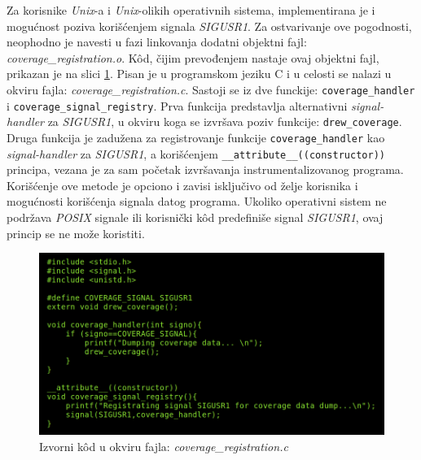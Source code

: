 \documentclass[12pt,oneside]{memoir}
\newcommand{\kod}[1]{\texttt{#1}}
\newcommand{\strano}[1]{\textit{#1}}
\begin{document}
Za korisnike \strano{Unix}-a i \strano{Unix}-olikih operativnih sistema, implementirana je i mogućnost poziva korišćenjem signala \strano{SIGUSR1}. Za ostvarivanje ove pogodnosti, neophodno je navesti u fazi linkovanja dodatni objektni fajl: \strano{coverage\_registration.o}. K\^{o}d, čijim prevođenjem nastaje ovaj objektni fajl, prikazan je na slici \ref{fig:registrator}. Pisan je u programskom jeziku C i u celosti se nalazi u okviru fajla:  \strano{coverage\_registration.c}. Sastoji se iz dve funckije: \kod{coverage\_handler} i \kod{coverage\_signal\_registry}. Prva funkcija predstavlja alternativni \strano{signal-handler} za \strano{SIGUSR1}, u okviru koga se izvršava poziv funkcije: \kod{drew\_coverage}. Druga funkcija je zadužena za registrovanje funkcije \kod{coverage\_handler} kao \strano{signal-handler} za \strano{SIGUSR1}, a korišćenjem \kod{\_\_attribute\_\_((constructor))} principa, vezana je za sam početak izvršavanja instrumentalizovanog programa. 
Korišćenje ove metode je opciono i zavisi isključivo od želje korisnika i mogućnosti korišćenja signala datog programa. Ukoliko operativni sistem ne podržava \strano{POSIX} signale ili korisnički k\^{o}d predefiniše signal \strano{SIGUSR1}, ovaj princip se ne može koristiti.

\begin{figure}[!ht]
  \centering
  \includegraphics[width=\textwidth]{img/coverage-registration-code.png}
  \caption{Izvorni k\^{o}d u okviru fajla: \strano{coverage\_registration.c}}
  \label{fig:registrator}
\end{figure}
\end{document}
